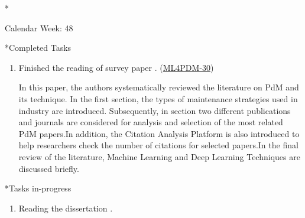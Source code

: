 \documentclass[11pt,a4paper]{article}
\begin{document}
\newpage
\begin{section}*{Calendar Week: 48 \hfill \date{27 November, 2020}}
 \begin{refsection}
     \begin{subsection}*{Completed Tasks}
         \begin{enumerate}
             \item
                   Finished the reading of survey paper \cite{DBLP:journals/candie/CarvalhoSVFBA19}. (\href{https://ml4pdm.atlassian.net/browse/ML4PDM-30}{ML4PDM-30})
                   \par In this paper, the authors systematically reviewed the literature on PdM and its technique. In the first section, the types of maintenance strategies used in industry are introduced. Subsequently, in section two different publications and journals are considered for analysis and selection of the most related PdM papers.In addition, the Citation Analysis Platform is also introduced to help researchers check the number of citations for selected papers.In the final review of the literature, Machine Learning and Deep Learning Techniques are discussed briefly.
         \end{enumerate}
     \end{subsection}

     \begin{subsection}*{Tasks in-progress}
         \begin{enumerate}
             \item
                   Reading the dissertation \cite{DBLP:phd/dnb/Kimotho16}.
         \end{enumerate}
     \end{subsection}

     \printbibliography
 \end{refsection}
\end{section}
\end{document}
